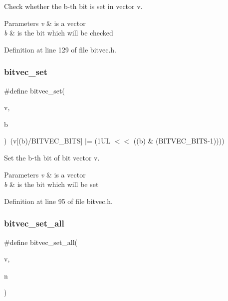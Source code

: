 Check whether the b-\/th bit is set in vector v. 


\begin{DoxyParams}{Parameters}
{\em v} & is a vector \\
\hline
{\em b} & is the bit which will be checked \\
\hline
\end{DoxyParams}


Definition at line 129 of file bitvec.\+h.

\mbox{\label{bitvec_8h_ae90878b8f2316f5733d83a3f47d378ac}} 
\subsubsection{bitvec\+\_\+set}
{\footnotesize\ttfamily \#define bitvec\+\_\+set(\begin{DoxyParamCaption}\item[{}]{v,  }\item[{}]{b }\end{DoxyParamCaption})~(v[(b)/B\+I\+T\+V\+E\+C\+\_\+\+B\+I\+TS] $\vert$= (1\+U\+L $<$$<$ ((b) \& (\+B\+I\+T\+V\+E\+C\+\_\+\+B\+I\+T\+S-\/1))))}



Set the b-\/th bit of bit vector v. 


\begin{DoxyParams}{Parameters}
{\em v} & is a vector \\
\hline
{\em b} & is the bit which will be set \\
\hline
\end{DoxyParams}


Definition at line 95 of file bitvec.\+h.

\mbox{\label{bitvec_8h_ab7abefb917e02790e9384d3149ff461e}} 
\subsubsection{bitvec\+\_\+set\+\_\+all}
{\footnotesize\ttfamily \#define bitvec\+\_\+set\+\_\+all(\begin{DoxyParamCaption}\item[{}]{v,  }\item[{}]{n }\end{DoxyParamCaption})}

